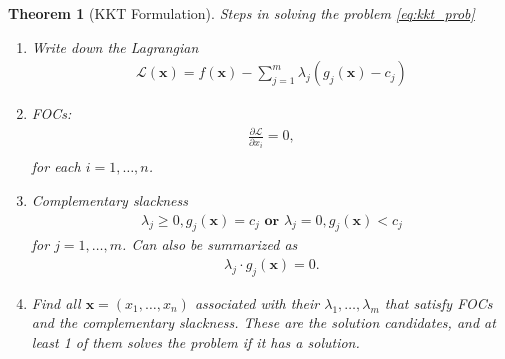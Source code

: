 \documentclass[11pt,a4paper]{book}
\newtheorem{theorem}{Theorem}[section]
\theoremstyle{definition}\newtheorem{definition}{Definition}
\theoremstyle{definition}\newtheorem{fact}{Fact}
\theoremstyle{definition}\newtheorem{remark}{Remark}
\theoremstyle{definition}\newtheorem{ex}{Ex.}
\theoremstyle{definition}\newtheorem{project}{Project}
\theoremstyle{definition}\newtheorem{problem}{Problem}
\theoremstyle{definition}\newtheorem{example}{Example}
\newenvironment{ftheorem}
{\begin{mdframed}\begin{theorem}}
		{\end{theorem}\end{mdframed}}
\numberwithin{theorem}{section}
\numberwithin{corollary}{chapter}
\numberwithin{assumption}{chapter}
\numberwithin{definition}{chapter}
\numberwithin{prop}{chapter}
\numberwithin{notation}{chapter}
\numberwithin{problem}{chapter}
\numberwithin{example}{chapter}
\numberwithin{fact}{chapter}
\numberwithin{ex}{chapter}
\def\x{\mathbf x}
\begin{document}
	\begin{ftheorem}[KKT Formulation]
		Steps in solving the problem \eqref{eq:kkt_prob}
		\begin{enumerate}
			\item Write down the Lagrangian
			\begin{align*}
				\mathcal{L}(\x) = f(\x) - \sum_{j=1}^m \lambda_j (g_j(\x) - c_j) 
			\end{align*} 
			
			\item FOCs:
			\begin{align*}
				\frac{\partial \mathcal{L}}{\partial x_i} = 0, \\
			\end{align*}
			for each $i=1, \dots, n$.
			
			\item Complementary slackness
			\begin{align*}
				\lambda_j \geq 0, g_j(\x) = c_j             
				\textbf{ or } \lambda_j = 0, g_j(\x) < c_j 
			\end{align*}
			for $j=1,\dots,m$. Can also be summarized as
			\begin{align*}
				\lambda_j \cdot g_j(\x) = 0.
			\end{align*}	
			
			\item Find all $\x = (x_1,\dots, x_n)$ associated with their $\lambda_1, \dots, \lambda_m$ that satisfy FOCs and the complementary slackness. These are the solution candidates, and at least 1 of them solves the problem if it has a solution.
		\end{enumerate}
	\end{ftheorem}
\end{document}
